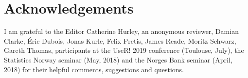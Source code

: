 \section{Acknowledgements}

I am grateful to the Editor Catherine Hurley, an anonymous reviewer, Damian Clarke, {\'E}ric Dubois, Jonas Kurle, Felix Pretis, James Reade, Moritz Schwarz, Gareth Thomas, participants at the UseR! 2019 conference (Toulouse, July), the Statistics Norway seminar (May, 2018) and the Norges Bank seminar (April, 2018) for their helpful comments, suggestions and questions.



\address{Genaro Sucarrat\\
  BI Norwegian Business School\\
  Nydalsveien 37, 0484 Oslo\\
  Norway\\
  }
